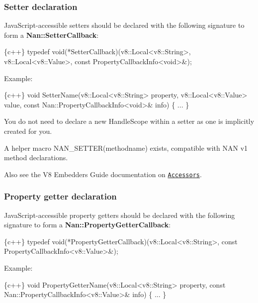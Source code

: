 \label{_api_nan_setter}%
 \subsubsection*{Setter declaration}

Java\+Script-\/accessible setters should be declared with the following signature to form a {\bfseries {\ttfamily Nan\+::\+Setter\+Callback}}\+:


\begin{DoxyCode}
\{c++\}
typedef void(*SetterCallback)(v8::Local<v8::String>,
                              v8::Local<v8::Value>,
                              const PropertyCallbackInfo<void>&);
\end{DoxyCode}


Example\+:


\begin{DoxyCode}
\{c++\}
void SetterName(v8::Local<v8::String> property,
                v8::Local<v8::Value> value,
                const Nan::PropertyCallbackInfo<void>& info) \{
  ...
\}
\end{DoxyCode}


You do not need to declare a new {\ttfamily Handle\+Scope} within a setter as one is implicitly created for you.

A helper macro {\ttfamily N\+A\+N\+\_\+\+S\+E\+T\+T\+E\+R(methodname)} exists, compatible with N\+AN v1 method declarations.

Also see the V8 Embedders Guide documentation on \href{https://developers.google.com/v8/embed#accesssors}{\tt Accessors}.

\label{_api_nan_property_getter}%
 \subsubsection*{Property getter declaration}

Java\+Script-\/accessible property getters should be declared with the following signature to form a {\bfseries {\ttfamily Nan\+::\+Property\+Getter\+Callback}}\+:


\begin{DoxyCode}
\{c++\}
typedef void(*PropertyGetterCallback)(v8::Local<v8::String>,
                                      const PropertyCallbackInfo<v8::Value>&);
\end{DoxyCode}


Example\+:


\begin{DoxyCode}
\{c++\}
void PropertyGetterName(v8::Local<v8::String> property,
                        const Nan::PropertyCallbackInfo<v8::Value>& info) \{
  ...
\}
\end{DoxyCode}



